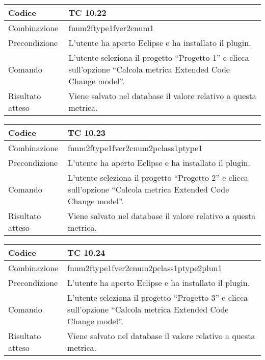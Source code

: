 \clearpage

\begin{table}[ht]
\begin{tabular}{|p{3cm}|p{9cm}|}
\hline
\cellcolor{lightgray}Codice				& TC 10.22								\\
\hline
\cellcolor{lightgray}Combinazione		& fnum2ftype1fver2cnum1									\\
\hline
\cellcolor{lightgray}Precondizione		& L'utente ha aperto Eclipse e ha installato il plugin.		\\
\hline
\cellcolor{lightgray}Comando			& L'utente seleziona il progetto ``Progetto 1''  e clicca sull'opzione ``Calcola metrica Extended Code Change model''.	\\
\hline
\cellcolor{lightgray}Risultato atteso	& Viene salvato nel database il valore relativo a questa metrica.\\
\hline
\end{tabular}
\end{table}


\begin{table}[ht]
\begin{tabular}{|p{3cm}|p{9cm}|}
\hline
\cellcolor{lightgray}Codice				& TC 10.23								\\
\hline
\cellcolor{lightgray}Combinazione		& fnum2ftype1fver2cnum2pclass1ptype1									\\
\hline
\cellcolor{lightgray}Precondizione		& L'utente ha aperto Eclipse e ha installato il plugin.		\\
\hline
\cellcolor{lightgray}Comando			& L'utente seleziona il progetto ``Progetto 2''  e clicca sull'opzione ``Calcola metrica Extended Code Change model''.	\\
\hline
\cellcolor{lightgray}Risultato atteso	& Viene salvato nel database il valore relativo a questa metrica.\\
\hline
\end{tabular}
\end{table}


\begin{table}[ht]
\begin{tabular}{|p{3cm}|p{9cm}|}
\hline
\cellcolor{lightgray}Codice				& TC 10.24								\\
\hline
\cellcolor{lightgray}Combinazione		& fnum2ftype1fver2cnum2pclass1ptype2plun1									\\
\hline
\cellcolor{lightgray}Precondizione		& L'utente ha aperto Eclipse e ha installato il plugin.		\\
\hline
\cellcolor{lightgray}Comando			& L'utente seleziona il progetto ``Progetto 3''  e clicca sull'opzione ``Calcola metrica Extended Code Change model''.	\\
\hline
\cellcolor{lightgray}Risultato atteso	& Viene salvato nel database il valore relativo a questa metrica.\\
\hline
\end{tabular}
\end{table}


